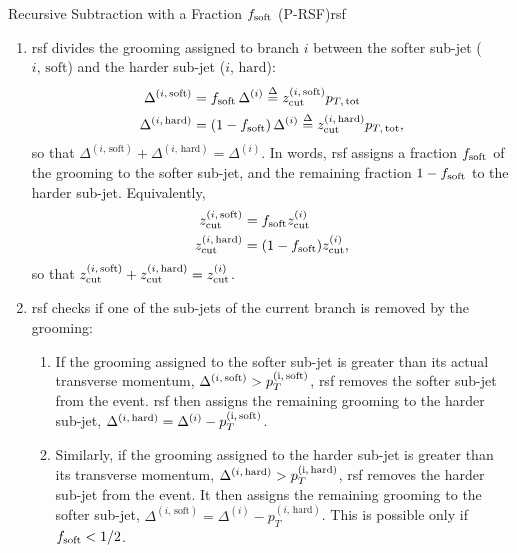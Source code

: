 \begin{definitionbox}{Recursive Subtraction with a Fraction \(f_{\rm soft}\) (P-RSF)}{rsf}
\begin{enumerate}
        \item
        \gls{rsf} divides the grooming assigned to branch \(i\) between the softer sub-jet (\(i,\,\text{soft}\)) and the harder sub-jet (\(i,\,\text{hard}\)):
        \begin{align}
            \Delta^{(i,\,\text{soft})}
        &=
        f_{\rm soft} \, \Delta^{(i)}
        \overset{\Delta}{=}
        z_{\rm cut}^{(i,\,\text{soft})} p_{T,\, \rm tot}
        \\
            \Delta^{(i,\,\text{hard})}
        &=
        (1-f_{\rm soft}) \, \Delta^{(i)}
        \overset{\Delta}{=}
        z_{\rm cut}^{(i,\,\text{hard})} p_{T,\, \rm tot}
            ,
        \end{align}
        so that \(\Delta^{(i,\,\text{soft})} + \Delta^{(i,\,\text{hard})} = \Delta^{(i)}\).
        In words, \gls{rsf} assigns a fraction \(f_{\rm soft}\) of the grooming to the softer sub-jet, and the remaining fraction \(1 - f_{\rm soft}\) to the harder sub-jet.
        Equivalently,
        \begin{align}
            z_{\rm cut}^{(i,\,\text{soft})} &= f_{\rm soft} z_{\rm cut}^{(i)}
            \\
            z_{\rm cut}^{(i,\,\text{hard})} &= (1-f_{\rm soft}) z_{\rm cut}^{(i)}
            ,
        \end{align}
        so that \(z_{\rm cut}^{(i,\,\text{soft})} + z_{\rm cut}^{(i,\,\text{hard})} = z_{\rm cut}^{(i)}\).
        \label{item:rsf_softhard}

        \item
        \gls{rsf} checks if one of the sub-jets of the current branch is removed by the grooming:

        \begin{enumerate}
        \item
        If the grooming assigned to the softer sub-jet is greater than its actual transverse momentum, \(\Delta^{(i,\,\text{soft})} > p_T^{(\rm i,\,\text{soft})}\), \gls{rsf} removes the softer sub-jet from the event.
        \gls{rsf} then assigns the remaining grooming to the harder sub-jet, \(\Delta^{(i,\,\text{hard})} = \Delta^{(i)} - p_T^{(\rm i,\,\text{soft})}\).
        \label{item:remove_soft}

        \item
        Similarly, if the grooming assigned to the harder sub-jet is greater than its transverse momentum, \(\Delta^{(i,\,\text{hard})} > p_T^{(\rm i,\,\text{hard})}\), \gls{rsf} removes the harder sub-jet from the event.
        It then assigns the remaining grooming to the softer sub-jet, \(\Delta^{(i,\,\text{soft})} = \Delta^{(i)} - p_{T}^{(i,\,\text{hard})}\).
        This is possible only if \(f_{\rm soft} < 1/2\).
        \label{item:remove_hard}
        \end{enumerate}


\end{enumerate}
\end{definitionbox}
